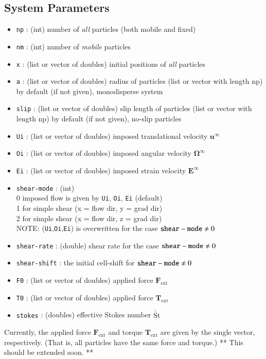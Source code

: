 \documentclass{book}
\begin{document}
\subsection{System Parameters}
\begin{itemize}
\item {\tt np} : (int) number of {\it all} particles (both mobile and fixed)
\item {\tt nm} : (int) number of {\it mobile} particles
\item {\tt x} : (list or vector of doubles)
  initial positions of {\it all} particles
\item {\tt a} : (list or vector of doubles)
  radius of particles (list or vector with length np)
  by default (if not given), monodisperse system
\item {\tt slip} : (list or vector of doubles)
  slip length of particles (list or vector with length np)
  by default (if not given), no-slip particles
\item {\tt Ui} : (list or vector of doubles)
  imposed translational velocity $\bm{u}^\infty$
\item {\tt Oi} : (list or vector of doubles)
  imposed angular velocity $\bm{\Omega}^\infty$
\item {\tt Ei} : (list or vector of doubles)
  imposed strain velocity $\bm{E}^\infty$
\item {\tt shear-mode} : (int)\\
  0 imposed flow is given by {\tt Ui}, {\tt Oi}, {\tt Ei} (default)\\
  1 for simple shear (x = flow dir, y = grad dir)\\
  2 for simple shear (x = flow dir, z = grad dir)\\
  NOTE: ({\tt Ui},{\tt Oi},{\tt Ei}) is overwritten 
  for the case ${\tt shear-mode} \ne 0$
\item {\tt shear-rate} : (double) shear rate 
  for the case ${\tt shear-mode} \ne 0$
\item {\tt shear-shift} : the initial cell-shift for 
  ${\tt shear-mode} \ne 0$
\item {\tt F0} : (list or vector of doubles)
  applied force $\bm{F}_{\text{ext}}$
\item {\tt T0} : (list or vector of doubles)
  applied force $\bm{T}_{\text{ext}}$
\item {\tt stokes} : (doubles) effective Stokes number $\widetilde{\text{St}}$
\end{itemize}
Currently, the applied force $\bm{F}_{\text{ext}}$
and torque $\bm{T}_{\text{ext}}$ are given by the single vector, respectively.
(That is, all particles have the same force and torque.)
** This should be extended soon. **
\end{document}
